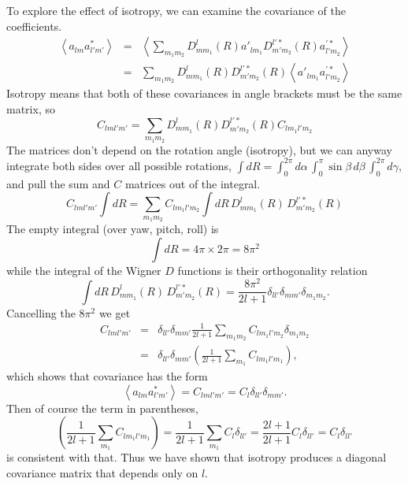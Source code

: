 \begin{subappendices}
To explore the effect of isotropy, we can examine the covariance of the coefficients.
\begin{eqnarray}
  \left\langle a_{lm} a^*_{l'm'} \right\rangle &=& \left\langle \sum_{m_1 m_2} D^l_{mm_1}(R) a'_{lm_1}  D^{l'*}_{m' m_2}(R)a^{\prime*}_{l'm_2} \right\rangle \\ \nonumber
  &=&  \sum_{m_1 m_2} D^l_{mm_1}(R) D^{l'*}_{m' m_2}(R) \left\langle  a'_{lm_1} a^{\prime*}_{l'm_2} \right\rangle
\end{eqnarray}
Isotropy means that both of these covariances in angle brackets must be the same matrix, so
\begin{equation}
C_{lml'm'} =  \sum_{m_1 m_2} D^l_{mm_1}(R)  D^{l'*}_{m' m_2}(R) C_{l m_1 l' m_2}
\end{equation}
The matrices don't depend on the rotation angle (isotropy), but we can anyway integrate both sides over all possible rotations, $\int dR = \int_0^{2\pi} d\alpha\,\int_0^{\pi} \sin\beta\, d\beta\, \int_0^{2\pi} d\gamma$, and pull the sum and $C$ matrices out of the integral.
\begin{equation}
C_{lml'm'} \int dR =  \sum_{m_1 m_2}  C_{l m_1 l' m_2} \int dR \, D^l_{mm_1}(R) \, D^{l'*}_{m' m_2}(R)
\end{equation}
  The empty integral (over yaw, pitch, roll) is
\begin{equation}
  \int dR = 4\pi \times 2\pi = 8\pi^2
\end{equation}
while the integral of the Wigner $D$ functions is their orthogonality relation
\begin{equation}
  \int dR \, D^l_{mm_1}(R)\,  D^{l'*}_{m' m_2}(R) = \frac{8\pi^2}{2l +1} \delta_{ll'}\delta_{mm'}\delta_{m_1 m_2}.
\end{equation}
Cancelling the $8\pi^2$ we get
\begin{eqnarray}
C_{lml'm'}  &=&  \delta_{ll'} \delta_{mm'} \frac{1}{2l +1} \sum_{m_1 m_2} C_{l m_1 l' m_2} \delta_{m_1 m_2} \\ \nonumber
&=&  \delta_{ll'} \delta_{mm'}  \left( \frac{1}{2l +1} \sum_{m_1} C_{l m_1 l' m_1} \right),
\end{eqnarray}
which shows that covariance has the form
\begin{equation}
   \left\langle a_{lm} a^*_{l'm'} \right\rangle = C_{lml'm'} = C_l \delta_{ll'} \delta_{mm'}.
\end{equation}
Then of course the term in parentheses,
\begin{equation}
   \left( \frac{1}{2l +1} \sum_{m_1} C_{l m_1 l' m_1} \right) =  \frac{1}{2l +1}  \sum_{m_1} C_l \delta_{ll'} =  \frac{2l+1}{2l +1}  C_l \delta_{ll'} = C_l \delta_{ll'}
\end{equation}
is consistent with that.  Thus we have shown that isotropy produces a diagonal covariance matrix that depends only on $l$. 




\end{subappendices}
